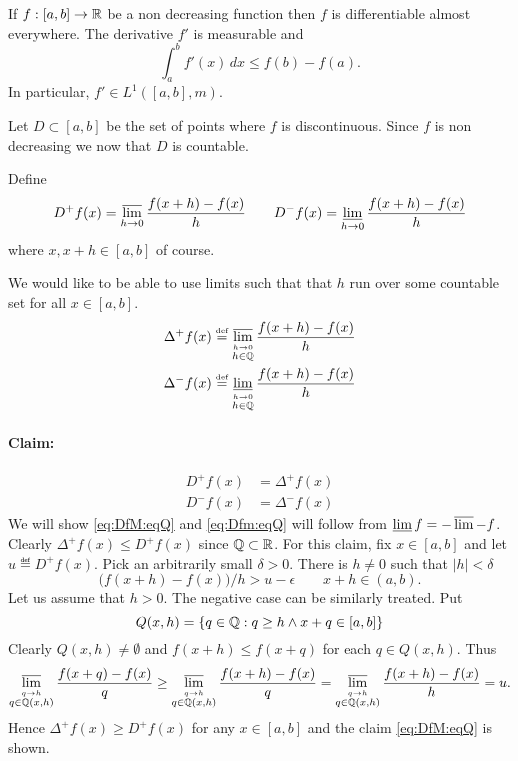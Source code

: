 \begin{llem} \label{lem:leb:diff}
If \(f:[a,b]\to\mathbb{R}\) be a non decreasing function
then $f$ is differentiable almost everywhere.
The derivative \(f'\) is measurable and 
\begin{equation*}
\int_a^b f'(x)\,dx \leq f(b) - f(a). \label{eq:lem:leb:diff}
\end{equation*}
In particular, \(f'\in L^1([a,b],m)\).
\end{llem}
\begin{thmproof}
Let \(D\subset [a,b]\) be the set of points where $f$ is discontinuous.
Since $f$ is non decreasing we now that $D$ is countable.

Define
\begin{equation} \label{eq:7:DfMDfm}
D^+f(x) = \varlimsup_{h\to 0} \frac{f(x+h)-f(x)}{h}
\qquad
D^-f(x) = \varliminf_{h\to 0} \frac{f(x+h)-f(x)}{h}
\end{equation}
where \(x,x+h \in [a,b]\) of course.

We would like to be able to use limits such that that $h$ run over
some countable set for all \(x\in[a,b]\).
\begin{align} 
\Delta^+f(x) &\stackrel{\mbox{\upshape\tiny def}}{=} \label{eq:7:DfMQ} 
   \varlimsup_{\stackrel{h\to 0}{h\in\mathbb{Q}}} \frac{f(x+h)-f(x)}{h} \\
\Delta^-f(x) &\stackrel{\mbox{\upshape\tiny def}}{=} \label{eq:7:DfmQ}
   \varliminf_{\stackrel{h\to 0}{h\in\mathbb{Q}}} \frac{f(x+h)-f(x)}{h}
\end{align}

\paragraph{Claim:} 
\begin{align}
D^+f(x) &= \Delta^+f(x)  \label{eq:DfM:eqQ} \\
D^-f(x) &= \Delta^-f(x)  \label{eq:Dfm:eqQ}
\end{align}
We will show \eqref{eq:DfM:eqQ} and \eqref{eq:Dfm:eqQ} 
will follow from \(\varliminf f = -\varlimsup -f\).
Clearly \(\Delta^+f(x) \leq D^+f(x) \) since \(\mathbb{Q}\subset\mathbb{R}\).
For this claim, fix \(x\in[a,b]\) and let \(u \eqdef D^+f(x)\).
Pick an arbitrarily small \(\delta>0\).
There is \(h\neq 0\) such that \(|h|<\delta\)
\begin{equation*}
\bigl(f(x+h) - f(x)\bigr)/h > u - \epsilon \qquad x+h\in(a,b).
\end{equation*}
Let us assume that \(h>0\). The negative case can be similarly treated.
Put
\begin{equation*}
Q(x,h) = \{q\in\mathbb{Q}: q\geq h \wedge x+q\in[a,b]\}
\end{equation*}
Clearly \(Q(x,h)\neq \emptyset\) and 
 \(f(x+h)\leq f(x+q)\) for each \(q\in Q(x,h)\).
Thus
\begin{equation*}
\varlimsup_{\stackrel{q\to h}{q\in\mathbb{Q}(x,h)}}  \frac{f(x+q) - f(x)}{q}
\geq \varlimsup_{\stackrel{q\to h}{q\in\mathbb{Q}(x,h)}}  \frac{f(x+h) - f(x)}{q}
= \varlimsup_{\stackrel{q\to h}{q\in\mathbb{Q}(x,h)}}  \frac{f(x+h) - f(x)}{h}
= u.
\end{equation*}
Hence \(\Delta^+f(x) \geq D^+f(x)\) for any \(x\in[a,b]\)
and the claim \eqref{eq:DfM:eqQ} is shown.


\end{thmproof}
